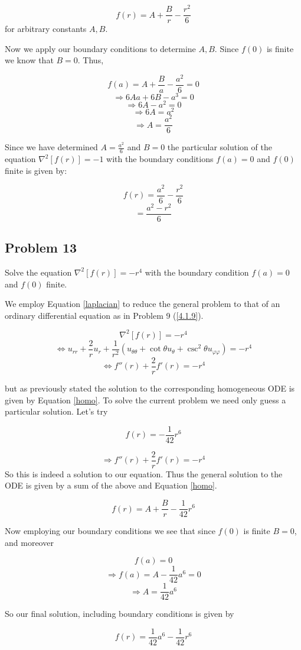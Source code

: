 \documentclass[12pt]{article}
\begin{document}
\[f(r)=A+\frac{B}{r}-\frac{r^2}{6}\] for arbitrary constants $A, B$.

Now we apply our boundary conditions to determine $A, B$. Since $f(0)$ is finite we know that $B=0$. Thus,

\[f(a)=A+\frac{B}{a}-\frac{a^2}{6}=0\]
\[\Rightarrow 6Aa+6B-a^3=0\]
\[\Rightarrow 6A-a^2=0\]
\[\Rightarrow 6A=a^2\]
\[\Rightarrow A=\frac{a^2}{6}\]

Since we have determined $A=\frac{a^2}{6}$ and $B=0$ the particular solution of the equation $\nabla^2\left[f(r)\right]=-1$ with the boundary conditions $f(a)=0$ and $f(0)$  finite is given by:

\[f(r)=\frac{a^2}{6}-\frac{r^2}{6}\]
\[=\frac{a^2-r^2}{6}\]

\subsection{Problem 13}

Solve the equation $\nabla^2\left[f(r)\right]=-r^4$ with the boundary condition $f(a)=0$ and $f(0)$ finite.

We employ Equation \ref{laplacian} to reduce the general problem to that of an ordinary differential equation as in Problem 9 (\ref{4.1.9}).

\[\nabla^2\left[f(r)\right]=-r^4\]
\[\iff u_{rr}+\frac{2}{r}u_r+\frac{1}{r^2}(u_{\theta\theta}+\cot{\theta}u_\theta+\csc^2{\theta}u_{\varphi\varphi})=-r^4\]
\[\iff f''(r)+\frac{2}{r}f'(r)=-r^4\]

but as previously stated the solution to the corresponding homogeneous ODE is given by Equation \ref{homo}. To solve the current problem we need only guess a particular solution. Let's try 

\[f(r)=-\frac{1}{42}r^6\]

\[\Rightarrow f''(r)+\frac{2}{r}f'(r)=-r^4\] So this is indeed a solution to our equation. Thus the general solution to the ODE is given by a sum of the above and Equation \ref{homo}.

\[f(r)= A+\frac{B}{r} - \frac{1}{42}r^6\]

Now employing our boundary conditions we see that since $f(0)$ is finite $B=0$, and moreover 

\[f(a)=0\]
\[\Rightarrow f(a)=A-\frac{1}{42}a^6=0\]
\[\Rightarrow A=\frac{1}{42}a^6\]

So our final solution, including boundary conditions is given by

\[f(r)= \frac{1}{42}a^6 - \frac{1}{42}r^6\]
\end{document}
